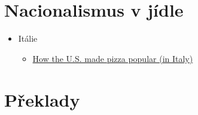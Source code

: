 \section{Nacionalismus v jídle}\label{Nacionalismusux20vux20juxeddle}

\begin{itemize}
\tightlist
\item
  Itálie

  \begin{itemize}
  \tightlist
  \item
    \href{https://www.youtube.com/watch?v=iZZfwyKa0Lc}{How the U.S. made
    pizza popular (in Italy)}
  \end{itemize}
\end{itemize}
\section{Překlady}



